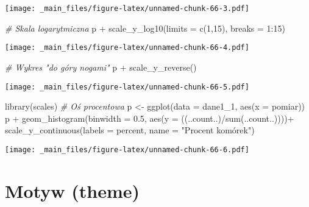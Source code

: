 \documentclass[
]{book}
\newenvironment{Shaded}{\begin{snugshade}}{\end{snugshade}}
\newcommand{\AttributeTok}[1]{\textcolor[rgb]{0.77,0.63,0.00}{#1}}
\newcommand{\CommentTok}[1]{\textcolor[rgb]{0.56,0.35,0.01}{\textit{#1}}}
\newcommand{\DecValTok}[1]{\textcolor[rgb]{0.00,0.00,0.81}{#1}}
\newcommand{\FloatTok}[1]{\textcolor[rgb]{0.00,0.00,0.81}{#1}}
\newcommand{\FunctionTok}[1]{\textcolor[rgb]{0.00,0.00,0.00}{#1}}
\newcommand{\NormalTok}[1]{#1}
\newcommand{\OtherTok}[1]{\textcolor[rgb]{0.56,0.35,0.01}{#1}}
\newcommand{\SpecialCharTok}[1]{\textcolor[rgb]{0.00,0.00,0.00}{#1}}
\newcommand{\StringTok}[1]{\textcolor[rgb]{0.31,0.60,0.02}{#1}}
\begin{document}
\texttt{[image: \_main\_files/figure-latex/unnamed-chunk-66-3.pdf]}

\begin{Shaded}
\begin{Highlighting}[]
\CommentTok{\# Skala logarytmiczna}
\NormalTok{p }\SpecialCharTok{+} \FunctionTok{scale\_y\_log10}\NormalTok{(}\AttributeTok{limits =} \FunctionTok{c}\NormalTok{(}\DecValTok{1}\NormalTok{,}\DecValTok{15}\NormalTok{), }\AttributeTok{breaks =} \DecValTok{1}\SpecialCharTok{:}\DecValTok{15}\NormalTok{)}
\end{Highlighting}
\end{Shaded}

\texttt{[image: \_main\_files/figure-latex/unnamed-chunk-66-4.pdf]}

\begin{Shaded}
\begin{Highlighting}[]
\CommentTok{\# Wykres "do góry nogami"}
\NormalTok{p }\SpecialCharTok{+} \FunctionTok{scale\_y\_reverse}\NormalTok{()}
\end{Highlighting}
\end{Shaded}

\texttt{[image: \_main\_files/figure-latex/unnamed-chunk-66-5.pdf]}

\begin{Shaded}
\begin{Highlighting}[]
\FunctionTok{library}\NormalTok{(scales)}
\CommentTok{\# Oś procentowa}
\NormalTok{p }\OtherTok{\textless{}{-}} \FunctionTok{ggplot}\NormalTok{(}\AttributeTok{data =}\NormalTok{ dane1\_1, }\FunctionTok{aes}\NormalTok{(}\AttributeTok{x =}\NormalTok{ pomiar))}
\NormalTok{p }\SpecialCharTok{+} \FunctionTok{geom\_histogram}\NormalTok{(}\AttributeTok{binwidth =} \FloatTok{0.5}\NormalTok{, }\FunctionTok{aes}\NormalTok{(}\AttributeTok{y =}\NormalTok{ ((..count..)}\SpecialCharTok{/}\FunctionTok{sum}\NormalTok{(..count..))))}\SpecialCharTok{+}
  \FunctionTok{scale\_y\_continuous}\NormalTok{(}\AttributeTok{labels =}\NormalTok{ percent, }\AttributeTok{name =} \StringTok{"Procent komórek"}\NormalTok{)}
\end{Highlighting}
\end{Shaded}

\texttt{[image: \_main\_files/figure-latex/unnamed-chunk-66-6.pdf]}

\hypertarget{motyw-theme}{%
\section{Motyw (theme)}\label{motyw-theme}}
\end{document}
